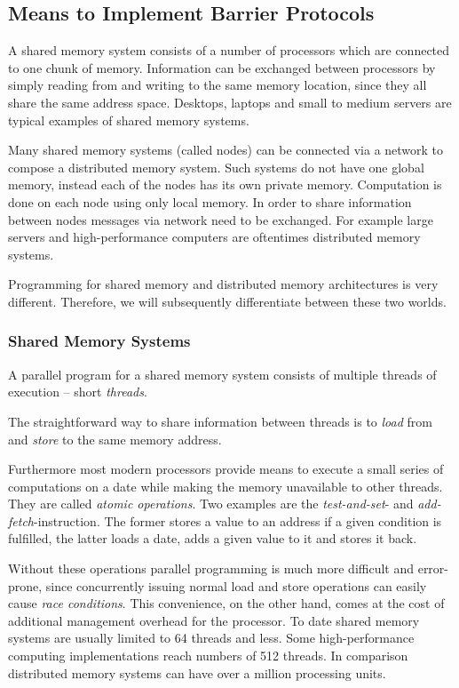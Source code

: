 \documentclass[a4paper, 10pt]{article}
\begin{document}
\subsection{Means to Implement Barrier Protocols}
\label{ssec:background-means}
A shared memory system consists of a number of processors which are connected to one chunk of memory. Information can be exchanged between processors by simply reading from and writing to the same memory location, since they all share the same address space.
Desktops, laptops and small to medium servers are typical examples of shared memory systems.

Many shared memory systems (called nodes) can be connected via a network to compose a distributed memory system. Such systems do not have one global memory, instead each of the nodes has its own private memory. Computation is done on each node using only local memory. In order to share information between nodes messages via network need to be exchanged.
For example large servers and high-performance computers are oftentimes distributed memory systems.

Programming for shared memory and distributed memory architectures is very different. Therefore, we will subsequently differentiate between these two worlds.

\subsubsection{Shared Memory Systems}
\label{sssec:background-means-shared}
A parallel program for a shared memory system consists of multiple threads of execution -- short \emph{threads}.

The straightforward way to share information between threads is to \emph{load} from and \emph{store} to the same memory address.

Furthermore most modern processors provide means to execute a small series of computations on a date while making the memory unavailable to other threads. They are called \emph{atomic operations}. Two examples are the \emph{test-and-set}- and \emph{add-fetch}-instruction. The former stores a value to an address if a given condition is fulfilled, the latter loads a date, adds a given value to it and stores it back.

Without these operations parallel programming is much more difficult and error-prone, since concurrently issuing normal load and store operations can easily cause \emph{race conditions}. This convenience, on the other hand, comes at the cost of additional management overhead for the processor. To date shared memory systems are usually limited to 64 threads and less. Some high-performance computing implementations reach numbers of 512 threads. In comparison distributed memory systems can have over a million processing units.
\end{document}
